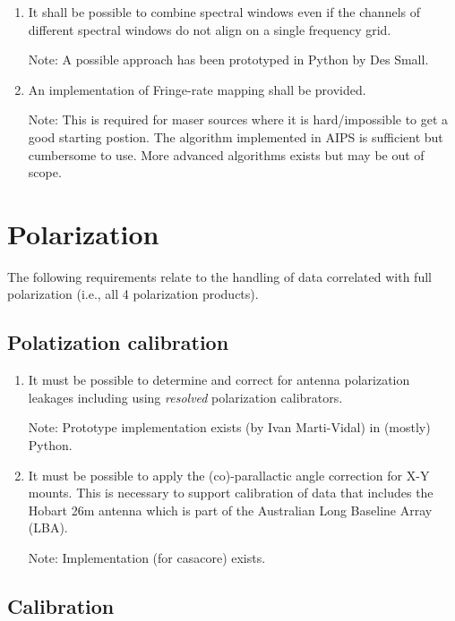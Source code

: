 \documentclass[11pt,a4paper]{article}
\begin{document}
\begin{enumerate}[subseclist]
\item It shall be possible to combine spectral windows even if the
  channels of different spectral windows do not align on a single
  frequency grid.

  Note: A possible approach has been prototyped in Python by Des Small.

\item An implementation of Fringe-rate mapping shall be provided.

  Note: This is required for maser sources where it is hard/impossible
  to get a good starting postion.  The algorithm implemented in AIPS
  is sufficient but cumbersome to use.  More advanced algorithms
  exists but may be out of scope.

\end{enumerate}


\section{Polarization}

The following requirements relate to the handling of data correlated
with full polarization (i.e., all 4 polarization products).

\subsection{ Polatization calibration}

\begin{enumerate}[subseclist]

\item It must be possible to determine and correct for antenna
  polarization leakages including using \emph{resolved} polarization
  calibrators.

  Note: Prototype implementation exists (by Ivan Marti-Vidal) in
  (mostly) Python.

\item It must be possible to apply the (co)-parallactic angle
  correction for X-Y mounts.  This is necessary to support calibration
  of data that includes the Hobart 26m antenna which is part of the
  Australian Long Baseline Array (LBA).

  Note: Implementation (for casacore) exists.

\end{enumerate}


\subsection{Calibration}
\end{document}
